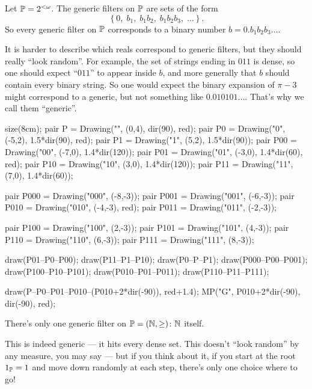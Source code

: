 \begin{example}
	Let $\mathbb P = 2^{<\omega}$.
	The generic filters on $\mathbb P$ are sets of the form
	\[ \left\{ 0,\; b_1,\; b_1b_2,\; b_1b_2b_3,\; \dots \right\}. \]
	So every generic filter on $\mathbb P$ corresponds
	to a binary number $b = 0.b_1b_2b_3\dots$.\footnotemark

	It is harder to describe which reals correspond to generic filters,
	but they should really ``look random''.
	For example, the set of strings ending in $011$ is dense,
	so one should expect ``$011$'' to appear inside $b$,
	and more generally that $b$ should contain every binary string.
	So one would expect the binary expansion of $\pi-3$ might correspond to a generic,
	but not something like $0.010101\dots$.
	That's why we call them ``generic''.

	\begin{center}
		\begin{asy}
			size(8cm);
			pair P = Drawing("\varnothing", (0,4), dir(90), red);
			pair P0 = Drawing("0", (-5,2), 1.5*dir(90), red);
			pair P1 = Drawing("1", (5,2),  1.5*dir(90));
			pair P00 = Drawing("00", (-7,0), 1.4*dir(120));
			pair P01 = Drawing("01", (-3,0), 1.4*dir(60), red);
			pair P10 = Drawing("10", (3,0),  1.4*dir(120));
			pair P11 = Drawing("11", (7,0),  1.4*dir(60));

			pair P000 = Drawing("000", (-8,-3));
			pair P001 = Drawing("001", (-6,-3));
			pair P010 = Drawing("010", (-4,-3), red);
			pair P011 = Drawing("011", (-2,-3));

			pair P100 = Drawing("100", (2,-3));
			pair P101 = Drawing("101", (4,-3));
			pair P110 = Drawing("110", (6,-3));
			pair P111 = Drawing("111", (8,-3));

			draw(P01--P0--P00);
			draw(P11--P1--P10);
			draw(P0--P--P1);
			draw(P000--P00--P001);
			draw(P100--P10--P101);
			draw(P010--P01--P011);
			draw(P110--P11--P111);

			draw(P--P0--P01--P010--(P010+2*dir(-90)), red+1.4);
			MP("G", P010+2*dir(-90), dir(-90), red);
		\end{asy}
	\end{center}
\end{example}

\begin{example}
	There's only one generic filter on $\mathbb P = (\mathbb N, \geq)$: $\mathbb N$ itself.

	This is indeed generic --- it hits every dense set.
	This doesn't ``look random'' by any measure, you may say ---
	but if you think about it, if you start at the root $1_\mathbb P = 1$ and move down randomly at each
	step, there's only one choice where to go!
\end{example}

